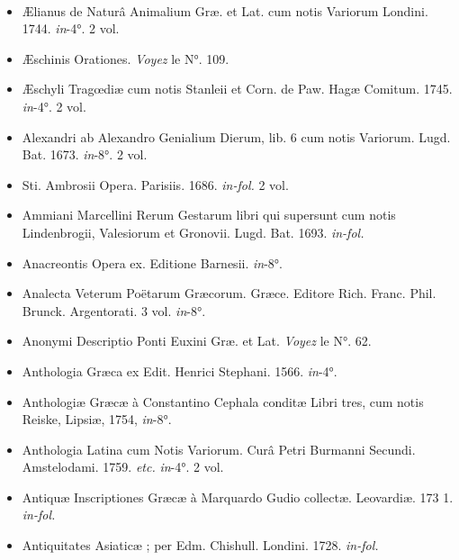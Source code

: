 \documentclass[a4paper, 18pt, oneside]{article}
\begin{document}
\paragraph{}
\begin{itemize}
    \item Ælianus de Naturâ Animalium Græ. et Lat. cum notis Variorum Londini. 1744. \emph{in}-4°. 2 vol.

    \item Æschinis Orationes. \emph{Voyez} le N°. 109.

    \item Æschyli Tragœdiæ cum notis Stanleii et Corn. de Paw. Hagæ Comitum. 1745. \emph{in}-4°. 2 vol.

    \item Alexandri ab Alexandro Genialium Dierum, lib. 6 cum notis Variorum. Lugd. Bat. 1673. \emph{in}-8°. 2 vol.

    \item Sti. Ambrosii Opera. Parisiis. 1686. \emph{in-fol.} 2 vol.

    \item Ammiani Marcellini Rerum Gestarum libri qui supersunt cum notis Lindenbrogii, Valesiorum et Gronovii. Lugd. Bat. 1693. \emph{in-fol.}

    \item Anacreontis Opera ex. Editione Barnesii. \emph{in}-8°.

    \item Analecta Veterum Poëtarum Græcorum. Græce. Editore Rich. Franc. Phil. Brunck. Argentorati. 3 vol. \emph{in}-8°.

    \item Anonymi Descriptio Ponti Euxini Græ. et Lat. \emph{Voyez} le N°. 62.

    \item Anthologia Græca ex Edit. Henrici Stephani. 1566. \emph{in}-4°.

    \item Anthologiæ Græcæ à Constantino Cephala conditæ Libri tres, cum notis Reiske, Lipsiæ, 1754, \emph{in}-8°.

    \item Anthologia Latina cum Notis Variorum. Curâ Petri Burmanni Secundi. Amstelodami. 1759. \emph{etc.} \emph{in}-4°. 2 vol.

    \item Antiquæ Inscriptiones Græcæ à Marquardo Gudio collectæ. Leovardiæ. 173 1. \emph{in-fol.}

    \item Antiquitates Asiaticæ ; per Edm. Chishull. Londini. 1728. \emph{in-fol.}


\end{itemize}
\end{document}
